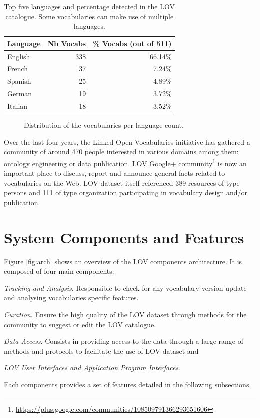 \documentclass{iosart2c}
\begin{document}
 \begin{table}[h!tb]
\caption{Top five languages and percentage detected in the LOV catalogue. Some vocabularies can make use of multiple languages.}
\begin{tabular}{lrr}
\hline
\textbf{Language} & \textbf{Nb Vocabs} & \textbf{\% Vocabs (out of 511)}  \\ \hline
English & 338 & 66.14\%      \\
French & 37 & 7.24\%      \\
Spanish & 25 & 4.89\%      \\
German & 19 & 3.72\%      \\
Italian & 18 & 3.52\%      \\
\hline  
\end{tabular}
\label{tab:language}
\end{table}

\begin{figure}[htb]

\caption{\label{fig:langdist} Distribution of the vocabularies per language count.}
\end{figure}

Over the last four years, the Linked Open Vocabularies initiative has gathered a community of around 470 people interested in various domains among them: ontology engineering or data publication. LOV Google+ community\footnote{\url{https://plus.google.com/communities/108509791366293651606}} is now an important place to discuss, report and announce general facts related to vocabularies on the Web. LOV dataset itself referenced 389 resources of type persons and 111 of type organization participating in vocabulary design and/or publication.



\section{System Components and Features}
	Figure \ref{fig:arch} shows an overview of the LOV components architecture. It is composed of four main components: 
\begin{inparaenum}[1)] 
	\item \emph{Tracking and Analysis}. Responsible to check for any vocabulary version update and analysing vocabularies specific features.
	\item \emph{Curation}. Ensure the high quality of the LOV dataset through methods for the community to suggest or edit the LOV catalogue.
	\item \emph{Data Access}. Consists in providing access to the data through a large range of methods and protocols to facilitate the use of LOV dataset and
	\item \emph{LOV User Interfaces and Application Program Interfaces}.
\end{inparaenum} 
Each components provides a set of features detailed in the following subsections.
\end{document}
